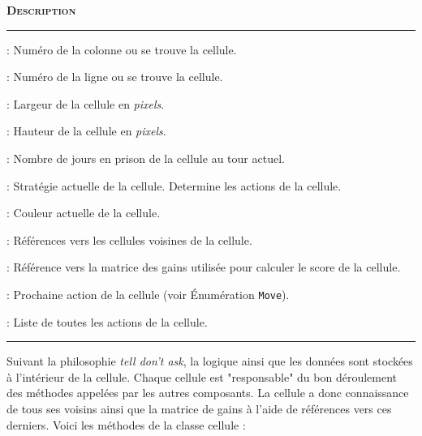 \documentclass[a4paper, french]{article}
\begin{document}
\vspace{0.25cm}
\begin{description}[labelwidth=2.50cm]
    \small
    \item[\textbf{\textsc{Champ}}] \textbf{\textsc{Description}}
    \vspace{0.1cm}
    \hrule{}
    \item[\texttt{x}]             :  Numéro de la colonne ou se trouve la cellule.
    \item[\texttt{y}]             :  Numéro de la ligne ou se trouve la cellule.
    \item[\texttt{width}]         :  Largeur de la cellule en \textit{pixels}.
    \item[\texttt{height}]        :  Hauteur de la cellule en \textit{pixels}.
    \item[\texttt{score}]         :  Nombre de jours en prison de la cellule au tour actuel.
    \item[\texttt{strategy}]      :  Stratégie actuelle de la cellule. Determine les actions de la cellule.
    \item[\texttt{color}]         :  Couleur actuelle de la cellule.
    \item[\texttt{neighbors}]     :  Références vers les cellules voisines de la cellule.
    \item[\texttt{payoffMatrix}]  :  Référence vers la matrice des gains utilisée pour calculer le score de la cellule.
    \item[\texttt{choice}]      :  Prochaine action de la cellule (voir Énumération \texttt{Move}).
    \item[\texttt{history}]       :  Liste de toutes les actions de la cellule.
\end{description}
\hrule{}
\vspace{0.5cm}

Suivant la philosophie \textit{tell don't ask}, la logique ainsi que les données sont stockées à l'intérieur de la cellule. Chaque cellule est "responsable" du bon déroulement des méthodes appelées par les autres composants. La cellule a donc connaissance de tous ses voisins ainsi que la matrice de gains à l'aide de références vers ces derniers. Voici les méthodes de la classe cellule : 
\end{document}
